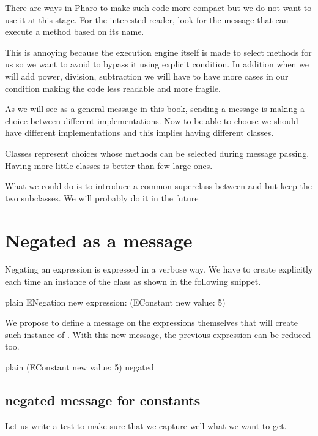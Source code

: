 \documentclass[10pt,twoside,english]{_support/latex/sbabook/sbabook}
\begin{document}
There are ways in Pharo to make such code more compact but we do not want to use it at this stage. For the interested reader, look for the message  that can execute a method based on its name. 

This is annoying because the execution engine itself is made to select methods for us so we want to avoid to bypass it using explicit condition. In addition when we will add power, division, subtraction we will have to have more cases in our condition making the code less
readable and more fragile. 

As we will see as a general message in this book, sending a message is making a choice between different implementations. 
Now to be able to choose we should have different implementations and this implies having different classes. 

\begin{important}
Classes represent choices whose methods can be selected during message passing. Having more little classes is better than few large ones. 
\end{important}

What we could do is to introduce a common superclass between  and  but keep the two subclasses. We will probably do it in the future
\section{Negated as a message}
Negating an expression is expressed in a verbose way. We have to create explicitly each time an instance of the class  as shown in the following snippet. 

\begin{displaycode}{plain}
ENegation new expression: (EConstant new value: 5)
\end{displaycode}

We propose to define a message  on the expressions themselves that will create such instance of .
With this new message, the previous expression can be reduced too. 

\begin{displaycode}{plain}
(EConstant new value: 5) negated
\end{displaycode}
\subsection{negated message for constants}
Let us write a test to make sure that we capture well what we want to get. 
\end{document}

